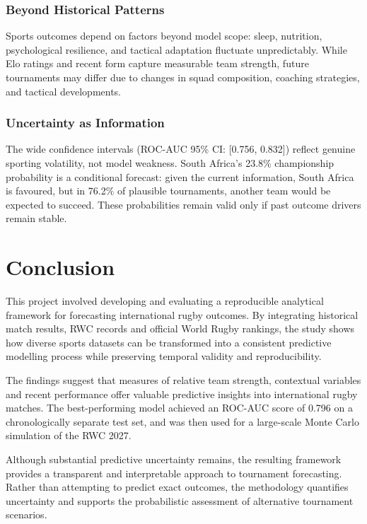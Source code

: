 \documentclass[12pt,a4paper,onecolumn]{article}
\begin{document}
\subsubsection{Beyond Historical Patterns}

Sports outcomes depend on factors beyond model scope: sleep, nutrition, psychological resilience, and tactical adaptation fluctuate unpredictably. While Elo ratings and recent form capture measurable team strength, future tournaments may differ due to changes in squad composition, coaching strategies, and tactical developments. \cite{Hvattum2010}

\subsubsection{Uncertainty as Information}

The wide confidence intervals (ROC-AUC 95\% CI: [0.756, 0.832]) reflect genuine sporting volatility, not model weakness. South Africa's 23.8\% championship probability is a conditional forecast: given the current information, South Africa is favoured, but in 76.2\% of plausible tournaments, another team would be expected to succeed. These probabilities remain valid only if past outcome drivers remain stable.

\section{Conclusion}

This project involved developing and evaluating a reproducible analytical framework for forecasting international rugby outcomes. By integrating historical match results, \cite{Begbie2022} RWC records \cite{Flashscore2024} and official World Rugby rankings, \cite{WorldRugby2024} the study shows how diverse sports datasets can be transformed into a consistent predictive modelling process while preserving temporal validity and reproducibility.

The findings suggest that measures of relative team strength, contextual variables and recent performance offer valuable predictive insights into international rugby matches. \cite{BunkerThabtah2019} The best-performing model achieved an ROC-AUC score of 0.796 on a chronologically separate test set, and was then used for a large-scale Monte Carlo simulation of the RWC 2027.

Although substantial predictive uncertainty remains, the resulting framework provides a transparent and interpretable approach to tournament forecasting. Rather than attempting to predict exact outcomes, the methodology quantifies uncertainty and supports the probabilistic assessment of alternative tournament scenarios. \cite{Guo2017}
\end{document}
